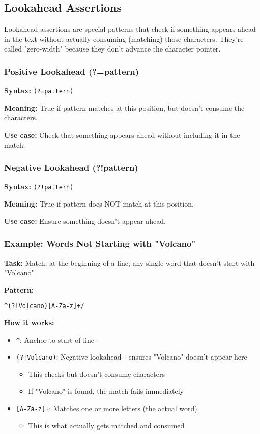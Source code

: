 \documentclass[11pt,a4paper]{article}
\theoremstyle{definition}
\theoremstyle{plain}
\theoremstyle{remark}
\begin{document}
\subsection{Lookahead Assertions}

Lookahead assertions are special patterns that check if something appears ahead in the text without actually consuming (matching) those characters. They're called "zero-width" because they don't advance the character pointer.

\subsubsection{Positive Lookahead (?=pattern)}

\textbf{Syntax:} \texttt{(?=pattern)}

\textbf{Meaning:} True if pattern matches at this position, but doesn't consume the characters.

\textbf{Use case:} Check that something appears ahead without including it in the match.

\subsubsection{Negative Lookahead (?!pattern)}

\textbf{Syntax:} \texttt{(?!pattern)}

\textbf{Meaning:} True if pattern does NOT match at this position.

\textbf{Use case:} Ensure something doesn't appear ahead.

\subsubsection{Example: Words Not Starting with "Volcano"}

\textbf{Task:} Match, at the beginning of a line, any single word that doesn't start with "Volcano"

\textbf{Pattern:}

\texttt{\^{}(?!Volcano)[A-Za-z]+/}

\textbf{How it works:}
\begin{itemize}
    \item \texttt{\^{}}: Anchor to start of line
    \item \texttt{(?!Volcano)}: Negative lookahead - ensures "Volcano" doesn't appear here
    \begin{itemize}
        \item This checks but doesn't consume characters
        \item If "Volcano" is found, the match fails immediately
    \end{itemize}
    \item \texttt{[A-Za-z]+}: Matches one or more letters (the actual word)
    \begin{itemize}
        \item This is what actually gets matched and consumed
    \end{itemize}
\end{itemize}
\end{document}
